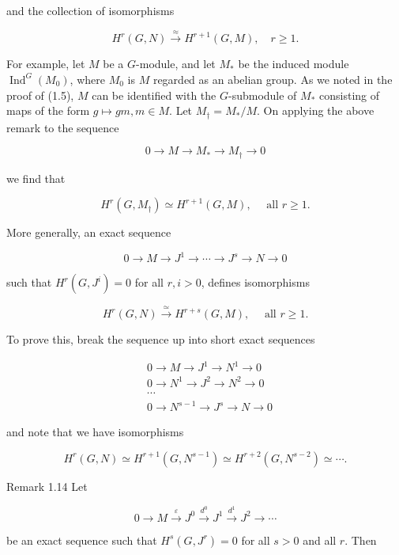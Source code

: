 \documentclass[10pt]{article}
\begin{document}
and the collection of isomorphisms

$$
H^{r}(G, N) \xrightarrow{\approx} H^{r+1}(G, M), \quad r \geq 1 .
$$

For example, let $M$ be a $G$-module, and let $M_{*}$ be the induced module $\operatorname{Ind}^{G}\left(M_{0}\right)$, where $M_{0}$ is $M$ regarded as an abelian group. As we noted in the proof of (1.5), $M$ can be identified with the $G$-submodule of $M_{*}$ consisting of maps of the form $g \mapsto g m, m \in M$. Let $M_{\dagger}=M_{*} / M$. On applying the above remark to the sequence


\begin{equation*}
0 \rightarrow M \rightarrow M_{*} \rightarrow M_{\dagger} \rightarrow 0 \tag{15}
\end{equation*}


we find that

$$
H^{r}\left(G, M_{\dagger}\right) \simeq H^{r+1}(G, M), \quad \text { all } r \geq 1 .
$$

More generally, an exact sequence

$$
0 \rightarrow M \rightarrow J^{1} \rightarrow \cdots \rightarrow J^{s} \rightarrow N \rightarrow 0
$$

such that $H^{r}\left(G, J^{i}\right)=0$ for all $r, i>0$, defines isomorphisms

$$
H^{r}(G, N) \xrightarrow{\simeq} H^{r+s}(G, M), \quad \text { all } r \geq 1 .
$$

To prove this, break the sequence up into short exact sequences

$$
\begin{aligned}
& 0 \rightarrow M \rightarrow J^{1} \rightarrow N^{1} \rightarrow 0 \\
& 0 \rightarrow N^{1} \rightarrow J^{2} \rightarrow N^{2} \rightarrow 0 \\
& \cdots \\
& 0 \rightarrow N^{s-1} \rightarrow J^{s} \rightarrow N \rightarrow 0
\end{aligned}
$$

and note that we have isomorphisms

$$
H^{r}(G, N) \simeq H^{r+1}\left(G, N^{s-1}\right) \simeq H^{r+2}\left(G, N^{s-2}\right) \simeq \cdots .
$$

Remark 1.14 Let

$$
0 \rightarrow M \xrightarrow{\varepsilon} J^{0} \xrightarrow{d^{0}} J^{1} \xrightarrow{d^{1}} J^{2} \rightarrow \cdots
$$

be an exact sequence such that $H^{s}\left(G, J^{r}\right)=0$ for all $s>0$ and all $r$. Then
\end{document}
